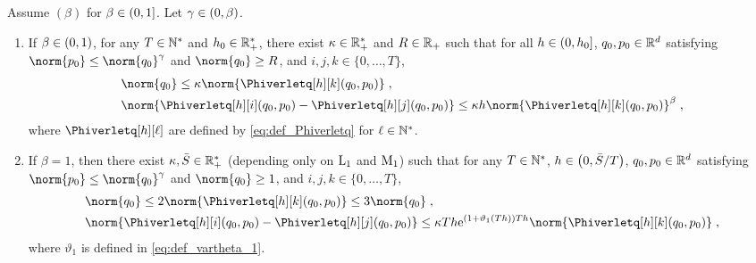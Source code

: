 \begin{lemma}
  \label{lem:prepa_bound_diff_ham}
Assume  $(\beta)$ for $\beta \in \left(0,1\right]$. Let $\gamma \in \left(0,\beta\right)$.
\begin{enumerate}[label=(\roman*)]
\item   \label{lem:prepa_bound_diff_ham_1}
If $ \beta \in \left(0,1\right)$, for any $T \in \mathbb{N}^{*}$ and  $h_0 \in \mathbb{R}^*_+$, there exist $\kappa \in \mathbb{R}^*_+$ and $R \in \mathbb{R}_+$ such that for all $h \in \left(0,h_0\right]$,  $q_0,p_0 \in \mathbb{R}^d$ satisfying $ \norm{p_0} \leq
\norm{\q_0}^{\gamma}$ and $\norm{\q_0} \geq R$, and $i,j,k \in
\{0,\ldots,T\}$,
\begin{align}
\label{eq:bound_iterate_q_2_prood_diff_ham_eq}
&\norm{q_0} \leq \kappa  \norm{\Phiverletq[h][k](q_0,p_0)}\eqsp, \\ &\norm{\Phiverletq[h][i](q_0,p_0)-\Phiverletq[h][j](q_0,p_0)} \leq \kappa h \norm{\Phiverletq[h][k](q_0,p_0)}^{\beta}  \eqsp,
\end{align}
  where $\Phiverletq[h][\ell]$ are defined by \eqref{eq:def_Phiverletq} for $\ell \in \mathbb{N}^*$.
\item \label{lem:prepa_bound_diff_ham_2}
If $\beta =1$, then there exist $\kappa, \bar{S} \in \mathbb{R}_+^*$ (depending only on $\mathrm{L}_1$ and $\mathrm{M}_1$) such that for any $T \in \mathbb{N}^{*}$, $h \in \left(0,\bar{S}/T\right)$,  $q_0,p_0 \in \mathbb{R}^d$ satisfying $ \norm{p_0} \leq
\norm{\q_0}^{\gamma}$ and $\norm{\q_0} \geq 1$, and $i,j,k \in
\{0,\ldots,T\}$,
\begin{align}
\label{eq:bound_iterate_q_2_prood_diff_ham_eq_2}
&\norm{q_0} \leq 2  \norm{\Phiverletq[h][k](q_0,p_0)} \leq 3 \norm{q_0} \eqsp, \\
&\norm{\Phiverletq[h][i](q_0,p_0)-\Phiverletq[h][j](q_0,p_0)}
\leq \kappa Th
\rme^{(1+\vartheta_1(Th))Th}  \norm{\Phiverletq[h][k](q_0,p_0)} \eqsp,
\end{align}
where $\vartheta_1$ is defined in \eqref{eq:def_vartheta_1}.
\end{enumerate}
\end{lemma}

